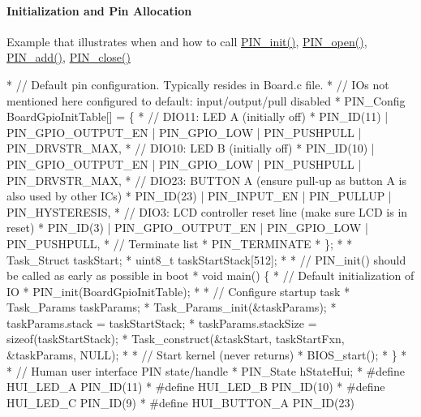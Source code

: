 \paragraph*{Initialization and Pin Allocation}

Example that illustrates when and how to call \hyperlink{_p_i_n_8h_a0de1df98a14e6e13b16db414e54472ef}{P\-I\-N\-\_\-init()}, \hyperlink{_p_i_n_8h_a731c5bb641ffeb064579432adfc8dba0}{P\-I\-N\-\_\-open()}, \hyperlink{_p_i_n_8h_ae96b7cc445336d52f8f6db762ff80156}{P\-I\-N\-\_\-add()}, \hyperlink{_p_i_n_8h_a877e82b9c5333a122cc408e103feba68}{P\-I\-N\-\_\-close()} 
\begin{DoxyCode}
*    \textcolor{comment}{// Default pin configuration. Typically resides in Board.c file.}
*    \textcolor{comment}{// IOs not mentioned here configured to default: input/output/pull disabled}
*    PIN_Config BoardGpioInitTable[] = \{
*        \textcolor{comment}{// DIO11: LED A (initially off)}
*        PIN_ID(11) | PIN_GPIO_OUTPUT_EN | PIN_GPIO_LOW | PIN_PUSHPULL | 
      PIN_DRVSTR_MAX,
*        \textcolor{comment}{// DIO10: LED B (initially off)}
*        PIN_ID(10)  | PIN_GPIO_OUTPUT_EN | PIN_GPIO_LOW | PIN_PUSHPULL | 
      PIN_DRVSTR_MAX,
*        \textcolor{comment}{// DIO23: BUTTON A (ensure pull-up as button A is also used by other ICs)}
*        PIN_ID(23) | PIN_INPUT_EN  | PIN_PULLUP | PIN_HYSTERESIS,
*        \textcolor{comment}{// DIO3: LCD controller reset line (make sure LCD is in reset)}
*        PIN_ID(3)  | PIN_GPIO_OUTPUT_EN | PIN_GPIO_LOW | PIN_PUSHPULL,
*        \textcolor{comment}{// Terminate list}
*        PIN_TERMINATE
*    \};
*
*    Task\_Struct taskStart;
*    uint8\_t     taskStartStack[512];
*
*    \textcolor{comment}{// PIN\_init() should be called as early as possible in boot}
*    \textcolor{keywordtype}{void} main() \{
*        \textcolor{comment}{// Default initialization of IO}
*        PIN_init(BoardGpioInitTable);
*
*        \textcolor{comment}{// Configure startup task}
*        Task\_Params taskParams;
*        Task\_Params\_init(&taskParams);
*        taskParams.stack = taskStartStack;
*        taskParams.stackSize = \textcolor{keyword}{sizeof}(taskStartStack);
*        Task\_construct(&taskStart, taskStartFxn, &taskParams, NULL);
*
*        \textcolor{comment}{// Start kernel (never returns)}
*        BIOS\_start();
*    \}
*
*    \textcolor{comment}{// Human user interface PIN state/handle}
*    PIN_State  hStateHui;
*    #define HUI\_LED\_A     PIN_ID(11)
*    #define HUI\_LED\_B     PIN_ID(10)
*    #define HUI\_LED\_C     PIN_ID(9)
*    #define HUI\_BUTTON\_A  PIN_ID(23)

\end{DoxyCode}
